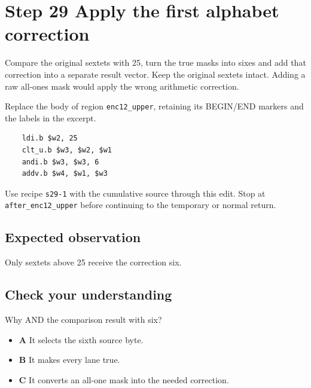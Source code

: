 \section{Step 29 Apply the first alphabet correction}\label{base64-s29}

Compare the original sextets with 25, turn the true masks into sixes and add that correction into a separate result vector. Keep the original sextets intact. Adding a raw all-ones mask would apply the wrong arithmetic correction.

Replace the body of region \texttt{enc12\_upper}, retaining its BEGIN/END markers and the labels in the excerpt.

\begin{verbatim}
    ldi.b $w2, 25
    clt_u.b $w3, $w2, $w1
    andi.b $w3, $w3, 6
    addv.b $w4, $w1, $w3
\end{verbatim}

Use recipe \texttt{s29-1} with the cumulative source through this edit. Stop at \texttt{after\_enc12\_upper} before continuing to the temporary or normal return.

\subsection{Expected observation}
Only sextets above 25 receive the correction six.

\subsection{Check your understanding}
Why AND the comparison result with six?

\begin{itemize}
\item \textbf{A} It selects the sixth source byte.
\item \textbf{B} It makes every lane true.
\item \textbf{C} It converts an all-one mask into the needed correction.
\end{itemize}
